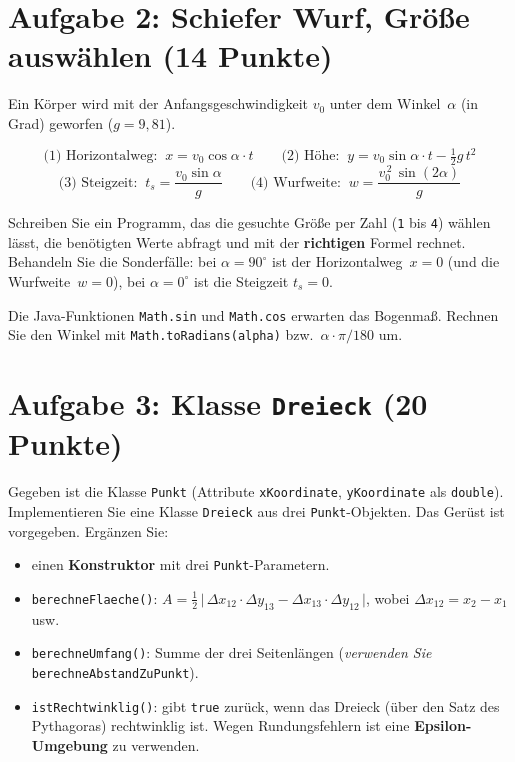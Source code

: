 \documentclass[
	fontsize=12pt,
	paper=a4,
	numbers=noenddot,
	parskip=half,
	openany
]{scrbook}
\begin{document}
\clearpage
\section*{Aufgabe 2: Schiefer Wurf, Größe auswählen \hfill (14 Punkte)}

Ein Körper wird mit der Anfangsgeschwindigkeit $v_0$ unter dem Winkel~$\alpha$ (in Grad) geworfen ($g = 9{,}81$).

\begin{formeln}
\[
	\text{(1) Horizontalweg:}\;\; x = v_0 \cos\alpha \cdot t
	\qquad
	\text{(2) Höhe:}\;\; y = v_0 \sin\alpha \cdot t - \tfrac{1}{2} g\,t^2
\]
\[
	\text{(3) Steigzeit:}\;\; t_s = \frac{v_0 \sin\alpha}{g}
	\qquad
	\text{(4) Wurfweite:}\;\; w = \frac{v_0^{\,2}\,\sin(2\alpha)}{g}
\]
\end{formeln}

Schreiben Sie ein Programm, das die gesuchte Größe per Zahl (\texttt{1} bis \texttt{4}) wählen lässt, die benötigten Werte abfragt und mit der \textbf{richtigen} Formel rechnet.
Behandeln Sie die Sonderfälle: bei $\alpha = 90^\circ$ ist der Horizontalweg~$x = 0$ (und die Wurfweite~$w = 0$), bei $\alpha = 0^\circ$ ist die Steigzeit $t_s = 0$.

\begin{hinweis}
	Die Java-Funktionen \texttt{Math.sin} und \texttt{Math.cos} erwarten das Bogenmaß.
	Rechnen Sie den Winkel mit \texttt{Math.toRadians(alpha)} bzw.\ $\alpha \cdot \pi/180$ um.
\end{hinweis}

\clearpage
\section*{Aufgabe 3: Klasse \texttt{Dreieck} \hfill (20 Punkte)}

Gegeben ist die Klasse \texttt{Punkt} (Attribute \texttt{xKoordinate}, \texttt{yKoordinate} als \texttt{double}).
Implementieren Sie eine Klasse \texttt{Dreieck} aus drei \texttt{Punkt}-Objekten.
Das Gerüst ist vorgegeben. Ergänzen Sie:

\begin{itemize}[nosep]
	\item einen \textbf{Konstruktor} mit drei \texttt{Punkt}-Parametern.
	\item \texttt{berechneFlaeche()}:
		$A = \tfrac{1}{2}\,\bigl|\,\Delta x_{12}\cdot\Delta y_{13} - \Delta x_{13}\cdot\Delta y_{12}\,\bigr|$,
		wobei $\Delta x_{12} = x_2 - x_1$ usw.
	\item \texttt{berechneUmfang()}: Summe der drei Seitenlängen (\emph{verwenden Sie}\\ \texttt{berechneAbstandZuPunkt}).
	\item \texttt{istRechtwinklig()}: gibt \texttt{true} zurück, wenn das Dreieck (über den Satz des Pythagoras) rechtwinklig ist.
		Wegen Rundungsfehlern ist eine \textbf{Epsilon-Umgebung} zu verwenden.
\end{itemize}
\end{document}
